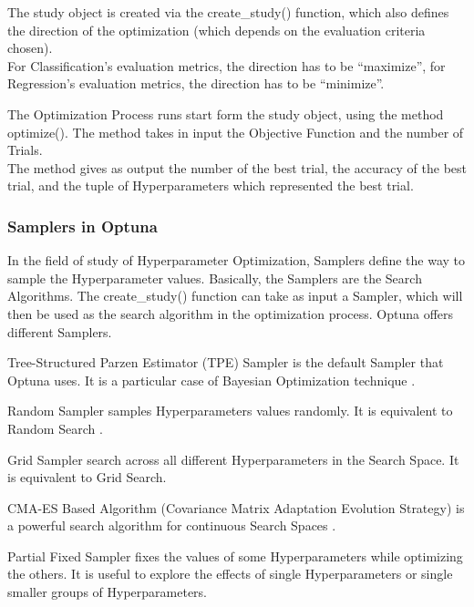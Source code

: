 The study object is created via the create\_study() function, which also defines the direction of the optimization (which depends on the evaluation criteria chosen).
\\[0.3cm]For Classification's evaluation metrics, the direction has to be “maximize”, for Regression's evaluation metrics, the direction has to be “minimize”.

The Optimization Process runs start form the study object, using the method optimize().
The method takes in input the Objective Function and the number of Trials.
\\[0.3cm]The method gives as output the number of the best trial, the accuracy of the best trial, and the tuple of Hyperparameters which represented the best trial.

\subsubsection{Samplers in Optuna}

In the field of study of Hyperparameter Optimization, Samplers define the way to sample the Hyperparameter values. Basically, the Samplers are the Search Algorithms.
The create\_study() function can take as input a Sampler, which will then be used as the search algorithm in the optimization process.
Optuna offers different Samplers.

Tree-Structured Parzen Estimator (TPE) Sampler is the default Sampler that Optuna uses. 
It is a particular case of Bayesian Optimization technique \cite{OptunaSamplers-TreeStructuredParzenEstimator}.

Random Sampler samples Hyperparameters values randomly. It is equivalent to Random Search \cite{OptunaSamplers-RandomSearch}.

Grid Sampler search across all different Hyperparameters in the Search Space. It is equivalent to Grid Search.

CMA-ES Based Algorithm (Covariance Matrix Adaptation Evolution Strategy) is a powerful search algorithm for continuous Search Spaces \cite{OptunaSamplers-CMA-ES}.

Partial Fixed Sampler fixes the values of some Hyperparameters while optimizing the others. It is useful to explore the effects of single Hyperparameters or single smaller groups of Hyperparameters.

